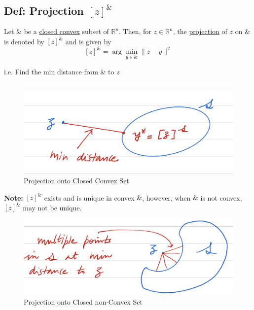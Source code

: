 \documentclass[11pt]{elegantbook}
\begin{document}
\subsection{Def: Projection $[z]^\&$}
\begin{definition}
    Let $\&$ be a \underline{closed convex} subset of $\mathbb{R}^n$. Then, for $z\in \mathbb{R}^n$, the \underline{projection} of $z$ on $\&$ is denoted by $[z]^\&$ and is given by
    $$[z]^\&=\arg \min_{y\in \&}\|z-y\|^2$$
\end{definition}
i.e. Find the min distance from $\&$ to $z$
\begin{center}\begin{figure}[htbp]
    \centering
    \includegraphics[scale=0.5]{projection1.png}
    \caption{Projection onto Closed Convex Set}
    \label{}
\end{figure}\end{center}
\textbf{Note:} $[z]^\&$ exists and is unique in convex $\&$, however, when $\&$ is not convex, $[z]^\&$ may not be unique.
\begin{center}\begin{figure}[htbp]
    \centering
    \includegraphics[scale=0.5]{projection2.png}
    \caption{Projection onto Closed non-Convex Set}
    \label{}
\end{figure}\end{center}
\end{document}
